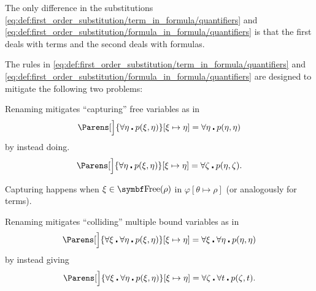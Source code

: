 \begin{definition}
\begin{DefEnum}
    The only difference in the substitutions \eqref{eq:def:first_order_substitution/term_in_formula/quantifiers} and \eqref{eq:def:first_order_substitution/formula_in_formula/quantifiers} is that the first deals with terms and the second deals with formulas.
  \end{DefEnum}
\end{definition}

\begin{remark}\label{rem:first_order_substitution_renaming_justification}
  The rules in \eqref{eq:def:first_order_substitution/term_in_formula/quantifiers} and \eqref{eq:def:first_order_substitution/formula_in_formula/quantifiers} are designed to mitigate the following two problems:

  \begin{RemEnum}
     Renaming mitigates \enquote{capturing} free variables as in
    \begin{equation*}
      \Parens[\Big]{ \forall \eta \centerdot p(\xi, \eta) }[\xi \mapsto \eta] = \forall \eta \centerdot p(\eta, \eta)
    \end{equation*}
    by instead doing.
    \begin{equation*}
      \Parens[\Big]{ \forall \eta \centerdot p(\xi, \eta) }[\xi \mapsto \eta] = \forall \zeta \centerdot p(\eta, \zeta).
    \end{equation*}

    Capturing happens when \( \xi \in \Bold{Free}(\rho) \) in \( \varphi[\theta \mapsto \rho] \) (or analogously for terms).

     Renaming mitigates \enquote{colliding} multiple bound variables as in
    \begin{equation*}
      \Parens[\Big]{ \forall \xi \centerdot \forall \eta \centerdot p(\xi, \eta) }[\xi \mapsto \eta] = \forall \xi \centerdot \forall \eta \centerdot p(\eta, \eta)
    \end{equation*}
    by instead giving
    \begin{equation*}
      \Parens[\Big]{ \forall \xi \centerdot \forall \eta \centerdot p(\xi, \eta) }[\xi \mapsto \eta] = \forall \zeta \centerdot \forall t \centerdot p(\zeta, t).
    \end{equation*}
  \end{RemEnum}
\end{remark}

